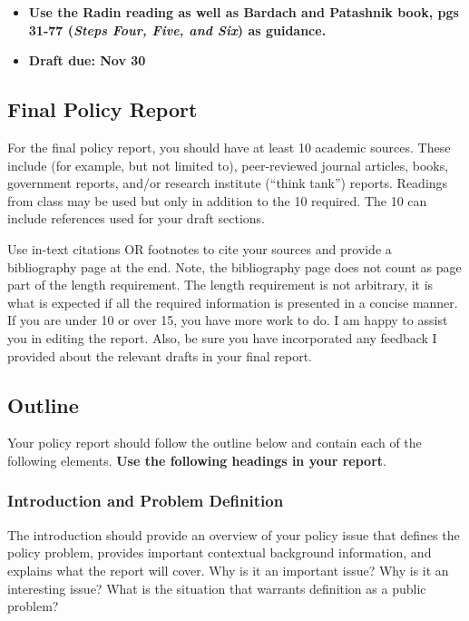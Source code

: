 \begin{itemize}
\item \textbf{Use the Radin reading as well as Bardach and Patashnik book, pgs 31-77 (\textit{Steps Four, Five, and Six}) as guidance.}

\item \textbf{Draft due: Nov 30}
\end{itemize}

\subsection{Final Policy Report}

For the final policy report, you should have at least 10 academic sources. These include (for example,
but not limited to), peer-reviewed journal articles, books, government
reports, and/or research institute (``think tank'') reports. Readings
from class may be used but only in addition to the 10 required. The 10
can include references used for your draft sections.

\vspace{0.10in}
\noindent Use in-text citations OR footnotes to cite your sources and provide a
bibliography page at the end. Note, the bibliography page does not count
as page part of the length requirement. The length requirement is not
arbitrary, it is what is expected if all the required information is
presented in a concise manner. If you are under 10 or over 15, you have
more work to do. I am happy to assist you in editing the report. Also,
be sure you have incorporated any feedback I provided about the relevant
drafts in your final report.

\hypertarget{outline}{%
\subsection{Outline}\label{outline}}

Your policy report should follow the outline below and contain each of
the following elements. \textbf{Use the following headings in your
report}.

\hypertarget{introduction-and-problem-definition}{%
\subsubsection{Introduction and Problem
Definition}\label{introduction-and-problem-definition}}

The introduction should provide an overview of your policy issue that
defines the policy problem, provides important contextual background
information, and explains what the report will cover. Why is it an
important issue? Why is it an interesting issue? What is the situation
that warrants definition as a public problem?


